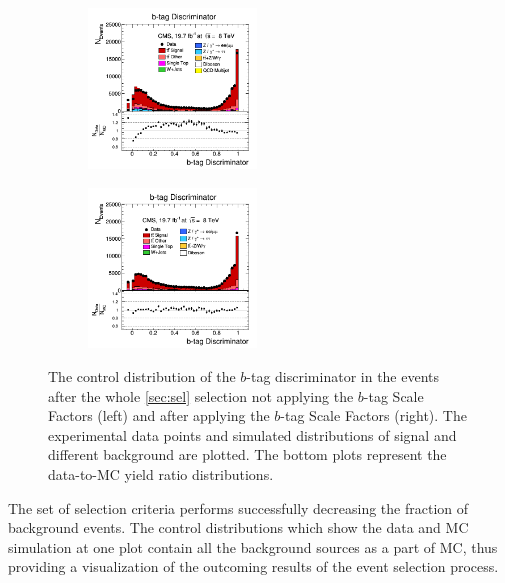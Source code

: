 \begin{itemize}
 \begin{figure}[h]
 \centering
 \begin{subfigure}
   \centering
   \includegraphics[width=0.49\textwidth]{04_event_reconstruction/plots/bTagDiscr_step6.png}
 \end{subfigure}
 \begin{subfigure}
   \centering
   \includegraphics[width=0.49\textwidth]{04_event_reconstruction/plots/bTagDiscr_step7.png}
 \end{subfigure}
 \caption{The control distribution of the $b$-tag discriminator in the events after the whole \ref{sec:sel} selection not applying the $b$-tag Scale Factors (left)
 and after applying the $b$-tag Scale Factors (right). The experimental data points and simulated distributions of signal and different background are plotted.
 The bottom plots represent the data-to-MC yield ratio distributions.}
 \label{fig:bTagDiscr}
 \end{figure}
 \end{itemize}

The set of selection criteria performs successfully decreasing the fraction of background events. The control distributions which show the data and MC simulation at one plot
contain all the background sources as a part of MC, thus providing a visualization of the outcoming results of the event selection process.


